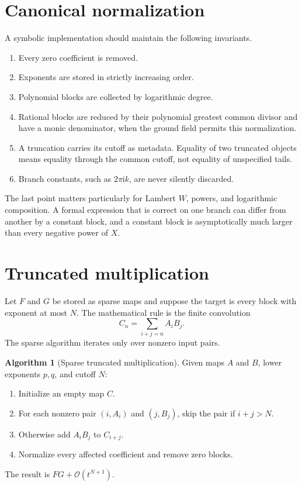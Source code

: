 \documentclass[11pt,openany]{book}
\theoremstyle{definition}
\newtheorem{algorithm}{Algorithm}[chapter]
\theoremstyle{plain}
\theoremstyle{remark}
\newcommand{\ii}{\mathrm{i}}
\newcommand{\bigO}{\mathcal{O}}
\begin{document}
\section{Canonical normalization}
A symbolic implementation should maintain the following invariants.
\begin{enumerate}
\item Every zero coefficient is removed.
\item Exponents are stored in strictly increasing order.
\item Polynomial blocks are collected by logarithmic degree.
\item Rational blocks are reduced by their polynomial greatest common divisor and have a monic denominator, when the ground field permits this normalization.
\item A truncation carries its cutoff as metadata. Equality of two truncated objects means equality through the common cutoff, not equality of unspecified tails.
\item Branch constants, such as \(2\pi \ii k\), are never silently discarded.
\end{enumerate}
The last point matters particularly for Lambert \(W\), powers, and logarithmic composition. A formal expression that is correct on one branch can differ from another by a constant block, and a constant block is asymptotically much larger than every negative power of \(X\).

\section{Truncated multiplication}
Let \(F\) and \(G\) be stored as sparse maps and suppose the target is every block with exponent at most \(N\). The mathematical rule is the finite convolution
\[
 C_n=\sum_{i+j=n}A_iB_j.
\]
The sparse algorithm iterates only over nonzero input pairs.

\begin{algorithm}[Sparse truncated multiplication]\label{alg:sparse-multiply}
Given maps \(A\) and \(B\), lower exponents \(p,q\), and cutoff \(N\):
\begin{enumerate}
\item Initialize an empty map \(C\).
\item For each nonzero pair \((i,A_i)\) and \((j,B_j)\), skip the pair if \(i+j>N\).
\item Otherwise add \(A_iB_j\) to \(C_{i+j}\).
\item Normalize every affected coefficient and remove zero blocks.
\end{enumerate}
The result is \(FG+\bigO(t^{N+1})\).
\end{algorithm}
\end{document}
